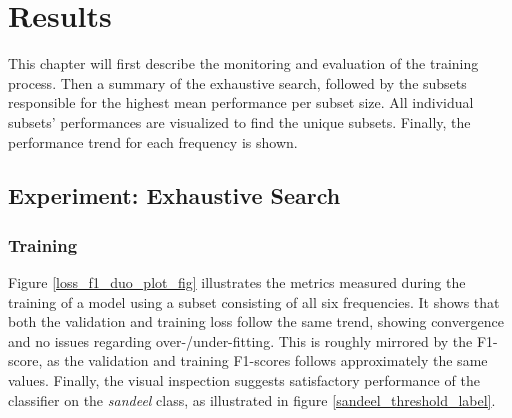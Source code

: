 \chapter{Results} \label{results}
This chapter will first describe the monitoring and evaluation of the training process. Then a summary of the exhaustive search, followed by the subsets responsible for the highest mean performance per subset size. All individual subsets’ performances are visualized to find the unique subsets. Finally, the performance trend for each frequency is shown. 

\section{Experiment: Exhaustive Search}
    
    \subsection{Training}

        
        
    Figure \ref{loss_f1_duo_plot_fig} illustrates the metrics measured during the training of a model using a subset consisting of all six frequencies. It shows that both the validation and training loss follow the same trend, showing convergence and no issues regarding over-/under-fitting. This is roughly mirrored by the F1-score, as the validation and training F1-scores follows approximately the same values. Finally, the visual inspection suggests satisfactory performance of the classifier on the \textit{sandeel} class, as illustrated in figure \ref{sandeel_threshold_label}.%
        
